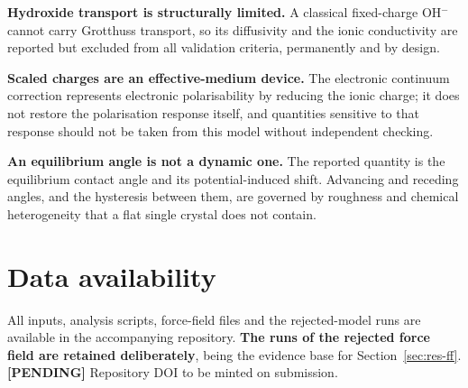 \documentclass[11pt,a4paper]{article}
\newcommand{\pending}[1]{\textcolor{brick}{\textbf{[PENDING]} #1}}
\begin{document}
\textbf{Hydroxide transport is structurally limited.} A classical fixed-charge OH$^-$ cannot carry
Grotthuss transport, so its diffusivity and the ionic conductivity are reported but excluded from all
validation criteria, permanently and by design.

\textbf{Scaled charges are an effective-medium device.} The electronic continuum correction
represents electronic polarisability by reducing the ionic charge; it does not restore the
polarisation response itself, and quantities sensitive to that response should not be taken from this
model without independent checking.

\textbf{An equilibrium angle is not a dynamic one.} The reported quantity is the equilibrium contact
angle and its potential-induced shift. Advancing and receding angles, and the hysteresis between
them, are governed by roughness and chemical heterogeneity that a flat single crystal does not
contain.

\section*{Data availability}
All inputs, analysis scripts, force-field files and the rejected-model runs are available in the
accompanying repository. \textbf{The runs of the rejected force field are retained deliberately},
being the evidence base for Section~\ref{sec:res-ff}. \pending{Repository DOI to be minted on submission.}
\end{document}
